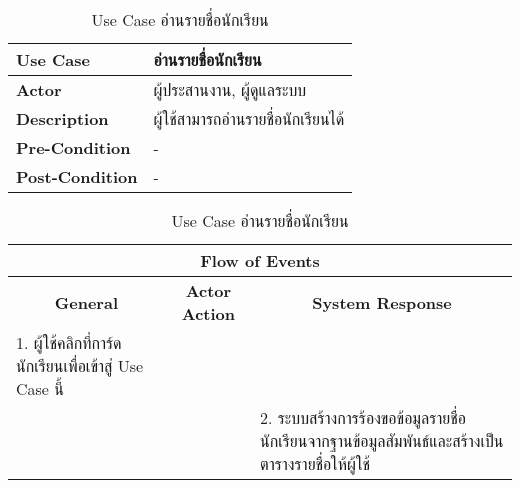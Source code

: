 \begin{table}[H]
    \caption{Use Case อ่านรายชื่อนักเรียน}
    \label{tab:usecase-read-student}
    \begin{tabularx}{\textwidth}{ | p{3cm} | X | }
    \hline
    \textbf{Use Case} & อ่านรายชื่อนักเรียน \\
    \hline
    \textbf{Actor} & ผู้ประสานงาน, ผู้ดูแลระบบ \\
    \hline
    \textbf{Description} & ผู้ใช้สามารถอ่านรายชื่อนักเรียนได้ \\
    \hline
    \textbf{Pre-Condition} & - \\
    \hline
    \textbf{Post-Condition} & - \\
    \hline
    \end{tabularx}
    \begin{tabularx}{\textwidth}{ | X | X | X | }
    \multicolumn{3}{|c|}{\textbf{Flow of Events}} \\
    \hline
    \multicolumn{1}{|c|}{\textbf{General}} & \multicolumn{1}{|c|}{\textbf{Actor Action}} & \multicolumn{1}{|c|}{\textbf{System Response}} \\
    \hline
    1. ผู้ใช้คลิกที่การ์ดนักเรียนเพื่อเข้าสู่ Use Case นี้ &  &  \\
    \hline
    & & 2. ระบบสร้างการร้องขอข้อมูลรายชื่อนักเรียนจากฐานข้อมูลสัมพันธ์และสร้างเป็นตารางรายชื่อให้ผู้ใช้ \\
    \hline
    \end{tabularx}
\end{table}

